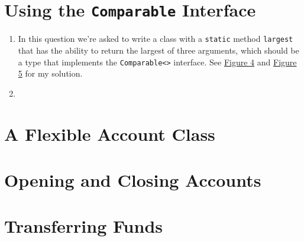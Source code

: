\documentclass[leqno, 11pt]{article}
\newcommand{\iftcodefigure}[3]{%
  \begin{codefigure}
    \label{#1}
    \addtocounter{figure}{-1}
    
  \end{codefigure}
}
\begin{document}
\section{Using the \texttt{Comparable} Interface}
\begin{enumerate}
  \item In this question we're asked to write a class with a \texttt{static} method \texttt{largest} that has the ability to return the largest of three arguments, which should be a type that implements the \texttt{Comparable<>} interface. See \hyperref[fig:three]{Figure 4} and \hyperref[fig:four]{Figure 5} for my solution.
  \item 
\end{enumerate}
\section{A Flexible Account Class}
\section{Opening and Closing Accounts}
\section{Transferring Funds}
\newpage
\iftcodefigure{fig:one}{Person.java}{%
  /home/brandon/eclipse-workspace/ift_194_labs/src/lab_4/Person.java}
\iftcodefigure{fig:two}{ChangingPeople.java}{%
  /home/brandon/eclipse-workspace/ift_194_labs/src/lab_4/ChangingPeople.java}
\iftcodefigure{fig:three}{Compare3.java}{%
  /home/brandon/eclipse-workspace/ift_194_labs/src/lab_4/Compare3.java}
\iftcodefigure{fig:four}{Comparisons.java}{%
  /home/brandon/eclipse-workspace/ift_194_labs/src/lab_4/Comparisons.java}
\end{document}
